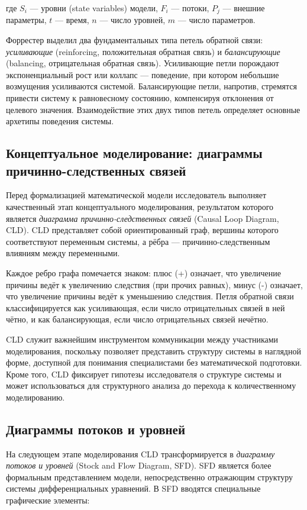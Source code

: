 где $S_i$ --- уровни (state variables) модели, $F_i$ --- потоки, $P_j$ --- внешние параметры, $t$ --- время, $n$ --- число уровней, $m$ --- число параметров.

Форрестер выделил два фундаментальных типа петель обратной связи: \emph{усиливающие} (reinforcing, положительная обратная связь) и \emph{балансирующие} (balancing, отрицательная обратная связь). Усиливающие петли порождают экспоненциальный рост или коллапс --- поведение, при котором небольшие возмущения усиливаются системой. Балансирующие петли, напротив, стремятся привести систему к равновесному состоянию, компенсируя отклонения от целевого значения. Взаимодействие этих двух типов петель определяет основные архетипы поведения системы.

\subsection{Концептуальное моделирование: диаграммы причинно-следственных связей}

Перед формализацией математической модели исследователь выполняет качественный этап концептуального моделирования, результатом которого является \emph{диаграмма причинно-следственных связей} (Causal Loop Diagram, CLD). CLD представляет собой ориентированный граф, вершины которого соответствуют переменным системы, а рёбра --- причинно-следственным влияниям между переменными.

Каждое ребро графа помечается знаком: плюс (+) означает, что увеличение причины ведёт к увеличению следствия (при прочих равных), минус (-) означает, что увеличение причины ведёт к уменьшению следствия. Петля обратной связи классифицируется как усиливающая, если число отрицательных связей в ней чётно, и как балансирующая, если число отрицательных связей нечётно.

CLD служит важнейшим инструментом коммуникации между участниками моделирования, поскольку позволяет представить структуру системы в наглядной форме, доступной для понимания специалистами без математической подготовки. Кроме того, CLD фиксирует гипотезы исследователя о структуре системы и может использоваться для структурного анализа до перехода к количественному моделированию.

\subsection{Диаграммы потоков и уровней}

На следующем этапе моделирования CLD трансформируется в \emph{диаграмму потоков и уровней} (Stock and Flow Diagram, SFD). SFD является более формальным представлением модели, непосредственно отражающим структуру системы дифференциальных уравнений. В SFD вводятся специальные графические элементы:

